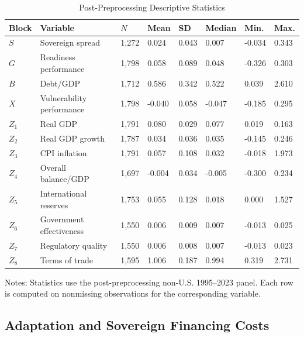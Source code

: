 \begin{table}[H]\centering
\begin{threeparttable}
\caption{Post-Preprocessing Descriptive Statistics}
\label{tab:summary_stats}
\scriptsize
\setlength{\tabcolsep}{2.6pt}
\begin{tabularx}{\textwidth}{llYYYYYY}
\toprule
Block & Variable & $N$ & Mean & SD & Median & Min. & Max. \\
\midrule
$S$ & Sovereign spread & 1,272 & 0.024 & 0.043 & 0.007 & -0.034 & 0.343 \\
$G$ & Readiness performance & 1,798 & 0.058 & 0.089 & 0.048 & -0.326 & 0.303 \\
$B$ & Debt/GDP & 1,712 & 0.586 & 0.342 & 0.522 & 0.039 & 2.610 \\
$X$ & Vulnerability performance & 1,798 & -0.040 & 0.058 & -0.047 & -0.185 & 0.295 \\
$Z_1$ & Real GDP & 1,791 & 0.080 & 0.029 & 0.077 & 0.019 & 0.163 \\
$Z_2$ & Real GDP growth & 1,787 & 0.034 & 0.036 & 0.035 & -0.145 & 0.246 \\
$Z_3$ & CPI inflation & 1,791 & 0.057 & 0.108 & 0.032 & -0.018 & 1.973 \\
$Z_4$ & Overall balance/GDP & 1,697 & -0.004 & 0.034 & -0.005 & -0.300 & 0.234 \\
$Z_5$ & International reserves & 1,753 & 0.055 & 0.128 & 0.018 & 0.000 & 1.527 \\
$Z_6$ & Government effectiveness & 1,550 & 0.006 & 0.009 & 0.007 & -0.013 & 0.025 \\
$Z_7$ & Regulatory quality & 1,550 & 0.006 & 0.008 & 0.007 & -0.013 & 0.023 \\
$Z_8$ & Terms of trade & 1,595 & 1.006 & 0.187 & 0.994 & 0.319 & 2.731 \\
\bottomrule
\end{tabularx}
\begin{tablenotes}[flushleft]\footnotesize
\item Notes: Statistics use the post-preprocessing non-U.S. 1995--2023 panel. Each row is computed on nonmissing observations for the corresponding variable.
\end{tablenotes}
\end{threeparttable}
\end{table}

\subsection{Adaptation and Sovereign Financing Costs}

